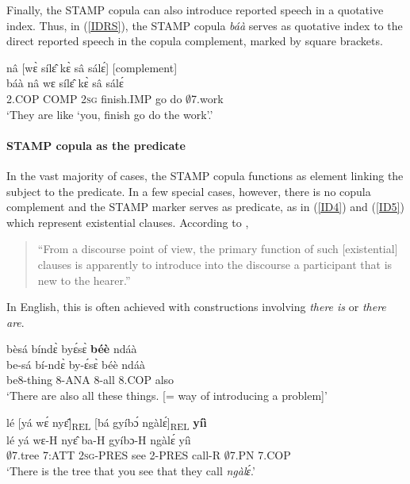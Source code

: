 Finally, the STAMP copula can also introduce reported speech in a quotative index. Thus, in (\ref{IDRS}), the STAMP copula {\itshape báà} serves as quotative index to the direct reported speech in the copula complement, marked by square brackets.


\begin{exe} 
\ex\label{IDRS}
   nâ [wɛ̀ sílɛ̂ kɛ̀ sâ sálɛ́] \hfill [complement]\\
        báà nâ wɛ sílɛ̂ kɛ̀ sâ sálɛ́ \\
        2.COP COMP 2\textsc{sg} finish.IMP go do $\emptyset$7.work  \\
    \trans `They are like `you, finish go do the work'.'
\end{exe}

\paragraph{STAMP copula as the predicate} In the vast majority of cases, the STAMP copula functions as element linking the subject to the predicate. In a few special cases, however, there is no copula complement and the STAMP marker serves as predicate, as in (\ref{ID4}) and (\ref{ID5}) which represent existential clauses. According to \citet[241]{dryer2007a}, 

\begin{quote} ``From a discourse point of view, the primary function of such [existential] clauses is apparently to introduce into the discourse a participant that is new to the hearer.'' \end{quote}
In English, this is often achieved with constructions involving {\itshape there is} or {\itshape there are}.

\begin{exe} 
\ex\label{ID4} 
  \glll bèsá bíndɛ̀ byɛ́sɛ̀ {\bfseries béè} ndáà \\
       be-sá bí-ndɛ̀ by-ɛ́sɛ̀ béè ndáà \\
        be8-thing 8-ANA 8-all 8.COP also \\
    \trans `There are also all these things. [= way of introducing a problem]'
\end{exe}

\begin{exe} 
\ex\label{ID5} 
  \glll lé [yá wɛ́ nyɛ̂]\textsubscript{REL} [bá gyíbɔ́ ngàlɛ́]\textsubscript{REL} {\bfseries yíì} \\
        lé yá wɛ-H nyɛ̂ ba-H gyíbɔ-H ngàlɛ́ yíì \\
       $\emptyset$7.tree 7:ATT 2\textsc{sg}-PRES see 2-PRES call-R $\emptyset$7.PN 7.COP   \\
    \trans `There is the tree that you see that they call {\itshape ngàlɛ́}.'
\end{exe}




